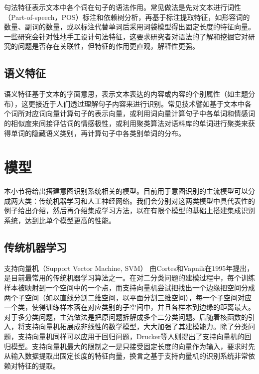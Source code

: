 句法特征表示文本中各个词在句子的语法作用。常见做法是先对文本进行词性（Part-of-speech，POS）标注和依赖树分析，再基于标注提取特征，如形容词的数量、副词的数量，或以标注代替单词后采用词袋模型得出固定长度的特征向量。一些研究会针对性地手工设计句法特征，这要求研究者对语法的了解和挖掘它对研究的问题是否存在关联性，但特征的作用更直观，解释性更强。

\subsection{语义特征} %

语义特征基于文本的字面意思，表示文本表达的内容或内容的个别属性‌（如主题分布），这更接近于人们透过理解句子内容来进行识别。常见技术譬如基于文本中各个词所对应词向量计算句子的表示向量，或利用词向量计算句子中各单词和情感词的相似度来间接评估词的情感极性，或利用聚类算法对语料库的单词进行聚类来获得单词的隐藏语义类别，再计算句子中各类别单词的分布。

\section{模型}

本小节将给出搭建意图识别系统相关的模型。目前用于意图识别的主流模型可以分成两大类：传统机器学习和人工神经网络。我们会分别对这两类模型中具代表性的例子给出介绍，然后再介绍集成学习方法，以在有限个模型的基础上搭建集成识别系统，达到比单个模型更高的性能。

\subsection{传统机器学习}

支持向量机（Support Vector Machine, SVM）\cite{cortes1995support} 由Cortes和Vapnik在1995年提出，是目前最常用的传统机器学习算法之一。在对二分类问题的建模过程中，每个训练样本被映射到一个空间中的一个点，而支持向量机尝试把找出一个边缘把空间分成两个子空间（如以直线分割二维空间，以平面分割三维空间），每一个子空间对应一个类，使得训练样本落在对应类别的子空间中，并且各样本到边缘的距离最大。对于多分类问题，主流做法是把原问题拆解成多个二分类问题。后随着核函数的引入，将支持向量机拓展成非线性的数学模型，大大加强了其建模能力。除了分类问题，支持向量机同样可以应用于回归问题，Drucker等人\cite{drucker1997support}则提出了支持向量机的回归模型。支持向量机最大的限制之一是只接受固定长度的向量作为输入，要求时先从输入数据提取出固定长度的特征向量，换言之基于支持向量机的识别系统非常依赖对特征的提取。

